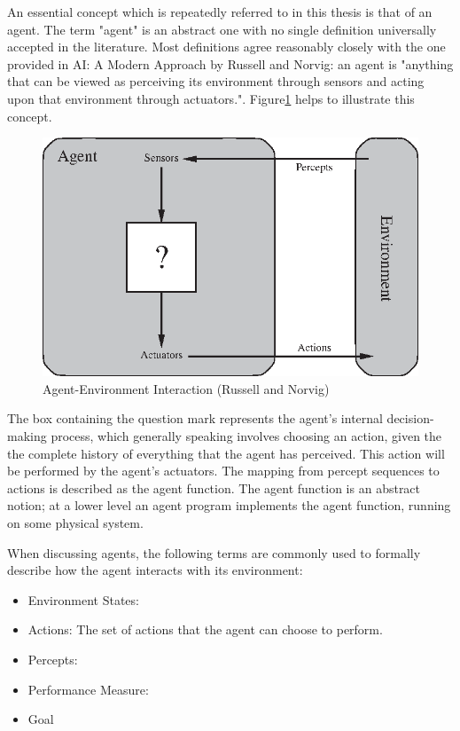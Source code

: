 
An essential concept which is repeatedly referred to in this thesis is that of an agent. The term "agent" is an abstract one with no single definition universally accepted in the literature. Most definitions agree reasonably closely with the one provided in AI: A Modern Approach by Russell and Norvig: an agent is "anything that can be viewed as perceiving its environment through sensors and acting upon that environment through actuators."\cite{AIAMA}.  Figure\ref{fig:agent_env_interaction} helps to illustrate this concept. \begin{figure}
    \centering
    \includegraphics{Chapters/BackgroundKnowledgeAndRelatedWork/Figs/Vector/agent-environment.eps}
    \caption{Agent-Environment Interaction (Russell and Norvig)\cite{AIAMA}}
    \label{fig:agent_env_interaction}
\end{figure}
The box containing the question mark represents the agent's internal decision-making process, which generally speaking involves choosing an action, given the the complete history of everything that the agent has perceived. This action will be performed by the agent's actuators. The mapping from percept sequences to actions is described as the agent function. The agent function is an abstract notion; at a lower level an agent program implements the agent function, running on some physical system.\newline

When discussing agents, the following terms are commonly used to formally describe how the agent interacts with its environment: 
\begin{itemize}
    \item Environment States:
    \item Actions: The set of actions that the agent can choose to perform. 
    \item Percepts:
    \item Performance Measure:
    \item Goal
\end{itemize}



